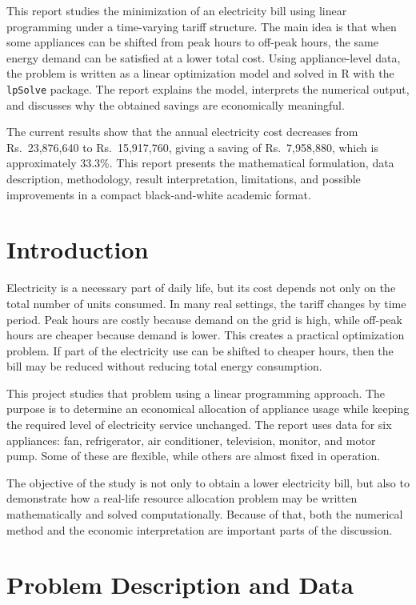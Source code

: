 \documentclass[12pt,a4paper]{article}
\begin{document}
This report studies the minimization of an electricity bill using linear programming under a time-varying tariff structure. The main idea is that when some appliances can be shifted from peak hours to off-peak hours, the same energy demand can be satisfied at a lower total cost. Using appliance-level data, the problem is written as a linear optimization model and solved in R with the \texttt{lpSolve} package. The report explains the model, interprets the numerical output, and discusses why the obtained savings are economically meaningful.

The current results show that the annual electricity cost decreases from Rs.\ 23,876,640 to Rs.\ 15,917,760, giving a saving of Rs.\ 7,958,880, which is approximately 33.3\%. This report presents the mathematical formulation, data description, methodology, result interpretation, limitations, and possible improvements in a compact black-and-white academic format.

\section{Introduction}

Electricity is a necessary part of daily life, but its cost depends not only on the total number of units consumed. In many real settings, the tariff changes by time period. Peak hours are costly because demand on the grid is high, while off-peak hours are cheaper because demand is lower. This creates a practical optimization problem. If part of the electricity use can be shifted to cheaper hours, then the bill may be reduced without reducing total energy consumption.

This project studies that problem using a linear programming approach. The purpose is to determine an economical allocation of appliance usage while keeping the required level of electricity service unchanged. The report uses data for six appliances: fan, refrigerator, air conditioner, television, monitor, and motor pump. Some of these are flexible, while others are almost fixed in operation.

The objective of the study is not only to obtain a lower electricity bill, but also to demonstrate how a real-life resource allocation problem may be written mathematically and solved computationally. Because of that, both the numerical method and the economic interpretation are important parts of the discussion.

\section{Problem Description and Data}
\end{document}
